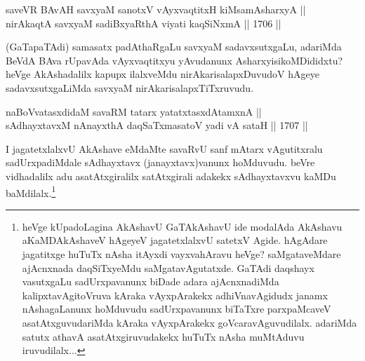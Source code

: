 \begin{shl}
saveVR BAvAH savxyaM sanotxV vAyxvaqtitxH kiMsamAsharxyA || \\
nirAkaqtA savxyaM sadiBxyaRthA viyati kaqSiNxmA ||  1706 ||  
\end{shl}

\begin{artha}
(GaTapaTAdi) samasatx padAthaRgaLu savxyaM sadavxsutxgaLu, adariMda BeVdA BAva rUpavAda vAyxvaqtitxyu yAvudanunx AsharxyisikoMDididxtu? heVge AkAshadalilx kapupx ilalxveMdu nirAkarisalapxDuvudoV hAgeye sadavxsutxgaLiMda savxyaM nirAkarisalapxTiTxruvudu.
\end{artha}

\begin{shl}
naBoVvatasxdidaM savaRM tatarx yatatxtasxdAtamxnA || \\
sAdhayxtavxM nAnayxthA daqSaTxmasatoV yadi vA sataH ||  1707 ||  
\end{shl}

\begin{artha}
I jagatetxlalxvU AkAshave eMdaMte savaRvU sanf mAtarx vAgutitxralu sadUrxpadiMdale sAdhayxtavx (janayxtavx)vanunx hoMduvudu. beVre vidhadalilx adu asatAtxgiralilx satAtxgirali adakekx sAdhayxtavxvu kaMDu baMdilalx.\footnote{heVge kUpadoLagina AkAshavU GaTAkAshavU ide modalAda AkAshavu aKaMDAkAshaveV hAgeyeV jagatetxlalxvU satetxV Agide. hAgAdare jagatitxge huTuTx nAsha itAyxdi vayxvahAravu heVge? saMgataveMdare ajAcnxnada daqSiTxyeMdu saMgatavAgutatxde. GaTAdi daqshayx vasutxgaLu sadUrxpavanunx biDade adara ajAcnxnadiMda kalipxtavAgitoVruva kAraka vAyxpArakekx adhiVnavAgidudx janamx nAshagaLanunx hoMduvudu sadUrxpavanunx biTaTxre parxpaMcaveV asatAtxguvudariMda kAraka vAyxpArakekx goVcaravAguvudilalx. adariMda satutx athavA asatAtxgiruvudakekx huTuTx nAsha muMtAduvu iruvudilalx...}
\end{artha}
